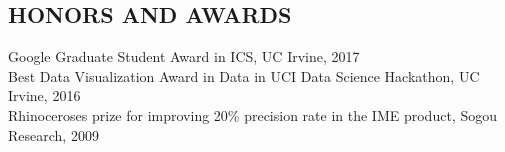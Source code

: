 \documentclass{res}
\begin{document}
\begin{resume}



\section{HONORS AND AWARDS}
Google Graduate Student Award in ICS, UC Irvine, 2017 \\
Best Data Visualization Award in Data in UCI Data Science Hackathon, UC Irvine, 2016 \\
Rhinoceroses prize for improving 20\% precision rate in the IME product, Sogou Research, 2009 \\


\end{resume}
\end{document}
